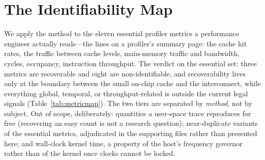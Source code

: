 \documentclass[conference]{IEEEtran}
\begin{document}
\section{The Identifiability Map}
\label{sec:map}

We apply the method to the eleven essential profiler metrics a performance
engineer actually reads---the lines on a profiler's summary page: the cache
hit rates, the traffic between cache levels, main-memory traffic and
bandwidth, cycles, occupancy, instruction throughput.
The verdict on the essential set: three metrics are
recoverable and eight are non-identifiable, and recoverability lives only at
the boundary between the small on-chip cache and the interconnect, while
everything global, temporal, or throughput-related is outside the current
legal signals (Table~\ref{tab:metricmap}). The two tiers are
separated by \emph{method}, not by subject. Out of scope, deliberately:
quantities a user-space trace reproduces for free (recovering an easy count
is not a research question); near-duplicate variants of the essential
metrics, adjudicated in the supporting files rather than presented here;
and wall-clock kernel time, a property of the host's frequency governor
rather than of the kernel once clocks cannot be locked.
\end{document}
